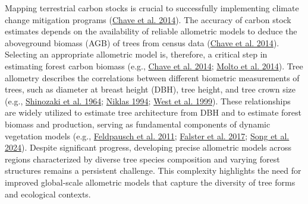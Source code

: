 \documentclass[
  12pt,
  letterpaper,
  DIV=11,
  numbers=noendperiod]{scrartcl}
\begin{document}
Mapping terrestrial carbon stocks is crucial to successfully
implementing climate change mitigation programs
(\protect\hyperlink{ref-Chave2014}{Chave et al. 2014}). The accuracy of
carbon stock estimates depends on the availability of reliable
allometric models to deduce the aboveground biomass (AGB) of trees from
census data (\protect\hyperlink{ref-Chave2014}{Chave et al. 2014}).
Selecting an appropriate allometric model is, therefore, a critical step
in estimating forest carbon biomass (e.g.,
\protect\hyperlink{ref-Chave2014}{Chave et al. 2014};
\protect\hyperlink{ref-Molto2014}{Molto et al. 2014}). Tree allometry
describes the correlations between different biometric measurements of
trees, such as diameter at breast height (DBH), tree height, and tree
crown size (e.g., \protect\hyperlink{ref-Shinozaki1964a}{Shinozaki et
al. 1964}; \protect\hyperlink{ref-Niklas1994}{Niklas 1994};
\protect\hyperlink{ref-West1999}{West et al. 1999}). These relationships
are widely utilized to estimate tree architecture from DBH and to
estimate forest biomass and production, serving as fundamental
components of dynamic vegetation models (e.g.,
\protect\hyperlink{ref-Feldpausch2011}{Feldpausch et al. 2011};
\protect\hyperlink{ref-Falster2017}{Falster et al. 2017};
\protect\hyperlink{ref-Song2024}{Song et al. 2024}). Despite significant
progress, developing precise allometric models across regions
characterized by diverse tree species composition and varying forest
structures remains a persistent challenge. This complexity highlights
the need for improved global-scale allometric models that capture the
diversity of tree forms and ecological contexts.
\end{document}
